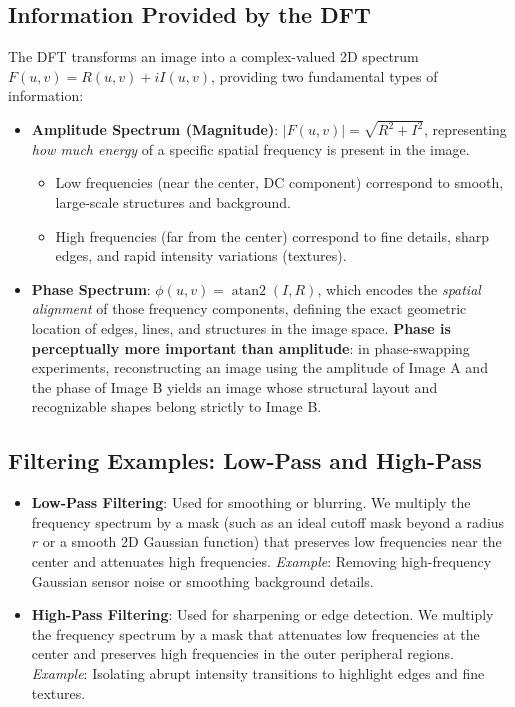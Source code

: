 \subsection{Information Provided by the DFT}
The DFT transforms an image into a complex-valued 2D spectrum $F(u,v) = R(u,v) + iI(u,v)$, providing two fundamental types of information:
\begin{itemize}
    \item \textbf{Amplitude Spectrum (Magnitude)}: $|F(u,v)| = \sqrt{R^2 + I^2}$, representing \textit{how much energy} of a specific spatial frequency is present in the image. 
    \begin{itemize}
        \item Low frequencies (near the center, DC component) correspond to smooth, large-scale structures and background.
        \item High frequencies (far from the center) correspond to fine details, sharp edges, and rapid intensity variations (textures).
    \end{itemize}
    \item \textbf{Phase Spectrum}: $\phi(u,v) = \operatorname{atan2}(I, R)$, which encodes the \textit{spatial alignment} of those frequency components, defining the exact geometric location of edges, lines, and structures in the image space. \textbf{Phase is perceptually more important than amplitude}: in phase-swapping experiments, reconstructing an image using the amplitude of Image A and the phase of Image B yields an image whose structural layout and recognizable shapes belong strictly to Image B.
\end{itemize}

\subsection{Filtering Examples: Low-Pass and High-Pass}
\begin{itemize}
    \item \textbf{Low-Pass Filtering}: Used for smoothing or blurring. We multiply the frequency spectrum by a mask (such as an ideal cutoff mask beyond a radius $r$ or a smooth 2D Gaussian function) that preserves low frequencies near the center and attenuates high frequencies. \textit{Example}: Removing high-frequency Gaussian sensor noise or smoothing background details.
    \item \textbf{High-Pass Filtering}: Used for sharpening or edge detection. We multiply the frequency spectrum by a mask that attenuates low frequencies at the center and preserves high frequencies in the outer peripheral regions. \textit{Example}: Isolating abrupt intensity transitions to highlight edges and fine textures.
\end{itemize}